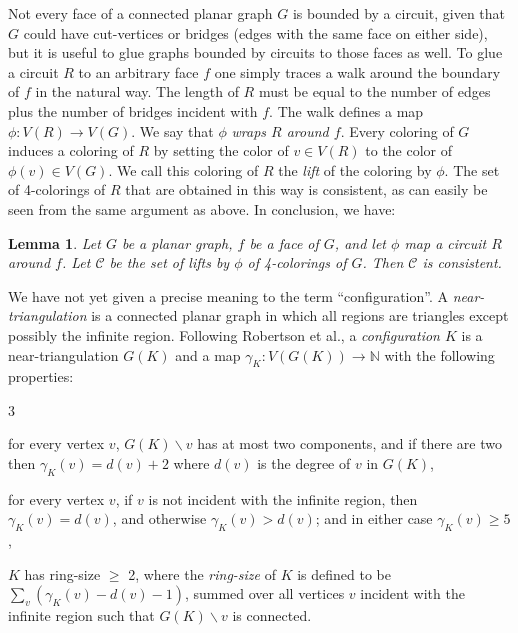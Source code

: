 \documentclass[11pt]{article}
\newtheorem{lemma}[theorem]{Lemma}     %
\newcommand{\nn}{\mathbb{N}}
\newcommand{\mcal}{\mathcal}
\newcommand{\back}{\backslash}
\newcommand{\gm}{\gamma}
\begin{document}
Not every face of a connected planar graph $G$ is bounded by a circuit, given that $G$ could have cut-vertices or bridges (edges with the same face on either side), but it is useful to glue graphs bounded by circuits to those faces as well. To glue a circuit $R$ to an arbitrary face $f$ one simply traces a walk around the boundary of $f$ in the natural way. The length of $R$ must be equal to the number of edges plus the number of bridges incident with $f$. The walk defines a map $\phi: V(R) \rightarrow V(G)$.
We say that $\phi$ 
\emph{wraps $R$ around $f$}. 
Every coloring of $G$ induces a coloring of $R$ by setting the color of $v \in V(R)$ to the color of $\phi(v) \in V(G)$. We call this coloring of $R$ the \emph{lift} of the coloring by $\phi$. The set of 4-colorings of $R$ that are obtained in this way is consistent, as can easily be seen from the same argument as above. 
In conclusion, we have:

\begin{lemma}\label{conslemma}
Let $G$ be a planar graph, $f$ be a face of $G$, and let $\phi$ map a circuit $R$ around $f$. Let $\mcal{C}$ be the set of lifts by $\phi$ of 4-colorings of $G$. Then $\mcal{C}$ is consistent.
\end{lemma}

\noindent We have not yet given a precise meaning to the term ``configuration''. 
A \emph{near-triangulation} is a connected planar graph in which all regions are triangles except possibly the infinite region. Following Robertson et al., a \emph{configuration $K$} is a near-triangulation $G(K)$ and a map $\gm_K : V(G(K)) \rightarrow \nn$ with the following properties:

	  {
	  \renewcommand{\theenumi}{\arabic{enumi}}
	  \renewcommand{\labelenumi}{(\theenumi)}
	  \begin{list}{3}{
	    \setlength{\itemindent}{35pt}
	    \setlength{\itemsep}{0pt}
	    \setlength{\parskip}{-5pt}
            \setlength{\leftmargin}{0pt}}
\item[(i)] for every vertex $v$, $G(K)\backslash v$ has at most two components, and if there are two then $\gm_K(v) = d(v) + 2$ where $d(v)$ is the degree of $v$ in $G(K)$,

\item[(ii)] for every vertex $v$, if $v$ is not incident with the infinite region, then $\gm_K(v) = d(v)$, and otherwise $\gm_K(v) > d(v)$; and in either case $\gm_K(v) \geq 5$,

\item[(iii)] $K$ has ring-size $\geq$ 2, where the \emph{ring-size} of $K$ is defined to be $\sum_v (\gm_K(v) - d(v) - 1)$, summed over all vertices $v$ incident with the infinite region such that $G(K)\back v$ is connected.
           \end{list}
          }
\end{document}

